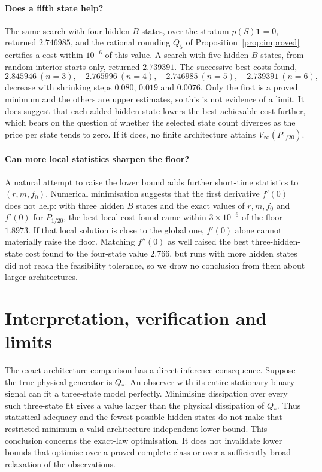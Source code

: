 \documentclass[11pt,a4paper]{article}
\theoremstyle{remark}\newtheorem{remark}[theorem]{Remark}
\newcommand{\one}{\mathbf 1}
\begin{document}
\paragraph{Does a fifth state help?}
The same search with four hidden $B$ states, over the stratum $p(S)\one=0$,
returned $2.746985$, and the rational rounding $Q_5$ of
Proposition~\ref{prop:improved} certifies a cost within $10^{-6}$ of this value.
A search with five hidden $B$ states, from random interior starts only,
returned $2.739391$. The successive best costs found,
\[
 2.845946\ (n=3),\quad 2.765996\ (n=4),\quad 2.746985\ (n=5),\quad
 2.739391\ (n=6),
\]
decrease with shrinking steps $0.080$, $0.019$ and $0.0076$. Only the first is
a proved minimum and the others are upper estimates, so this is not evidence
of a limit. It does suggest that each added hidden state lowers the best
achievable cost further, which bears on the question of \cite{aznagulov} whether the
selected state count diverges as the price per state tends to zero. If it
does, no finite architecture attains $V_\infty(P_{1/20})$.

\paragraph{Can more local statistics sharpen the floor?}
A natural attempt to raise the lower bound adds further short-time
statistics to $(r,m,f_0)$. Numerical minimisation suggests that the first
derivative $f'(0)$ does not help: with three hidden $B$ states and the exact
values of $r,m,f_0$ and $f'(0)$ for $P_{1/20}$, the best local cost found came
within $3\times10^{-6}$ of the floor $1.8973$. If that local solution is close
to the global one, $f'(0)$ alone cannot materially raise the floor. Matching
$f''(0)$ as well raised the best three-hidden-state cost found to the
four-state value $2.766$, but runs with more hidden states did not reach the
feasibility tolerance, so we draw no conclusion from them about larger
architectures.


\section{Interpretation, verification and limits}

\label{sec:discussion}

The exact architecture comparison has a direct inference consequence. Suppose
the true physical generator is $Q_*$. An observer with its entire stationary
binary signal can fit a three-state model perfectly. Minimising dissipation
over every such three-state fit gives a value larger than the physical
dissipation of $Q_*$. Thus statistical adequacy and the fewest possible hidden
states do not make that restricted minimum a valid architecture-independent
lower bound. This conclusion concerns the exact-law optimisation. It does
not invalidate lower bounds that optimise over a proved complete class or
over a sufficiently broad relaxation of the observations.
\end{document}
